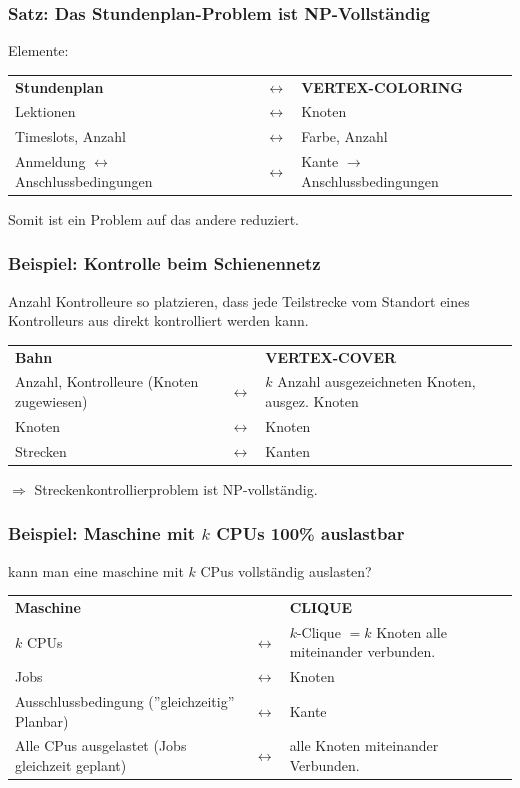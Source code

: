 \subsubsection{Satz: Das Stundenplan-Problem ist NP-Vollständig}

Elemente:

\begin{tabu}{l c l}
	\textbf{Stundenplan} &$\leftrightarrow$& \textbf{VERTEX-COLORING} \\
Lektionen &$\leftrightarrow$& Knoten\\
Timeslots, Anzahl &$\leftrightarrow$& Farbe, Anzahl\\
Anmeldung $\leftrightarrow$ Anschlussbedingungen &$\leftrightarrow$& Kante $\rightarrow$ Anschlussbedingungen
\end{tabu}

Somit ist ein Problem auf das andere reduziert.


\subsubsection{Beispiel: Kontrolle beim Schienennetz}

Anzahl Kontrolleure so platzieren, dass jede Teilstrecke vom Standort eines Kontrolleurs aus direkt kontrolliert werden kann.

\begin{tabu}{l c l}
	\textbf{Bahn} & & \textbf{VERTEX-COVER} \\
	Anzahl, Kontrolleure (Knoten zugewiesen) &$\leftrightarrow$&$k$ Anzahl ausgezeichneten Knoten, ausgez. Knoten\\
	Knoten &$\leftrightarrow$& Knoten\\
	Strecken &$\leftrightarrow$& Kanten\\
\end{tabu}

$\Rightarrow$ Streckenkontrollierproblem ist NP-vollständig.


\subsubsection{Beispiel: Maschine mit $k$ CPUs 100\% auslastbar}

kann man eine maschine mit $k$ CPus vollständig auslasten?

\begin{tabu}{l c l}
	
	\textbf{Maschine} & & \textbf{CLIQUE} \\
	 $k$ CPUs &$\leftrightarrow$& $k$-Clique $= k$ Knoten alle miteinander verbunden.\\
	Jobs &$\leftrightarrow$& Knoten\\
	Ausschlussbedingung (''gleichzeitig'' Planbar) &$\leftrightarrow$& Kante\\
	Alle CPus ausgelastet (Jobs gleichzeit geplant) &$\leftrightarrow$& alle Knoten miteinander Verbunden.\\
\end{tabu} \\

